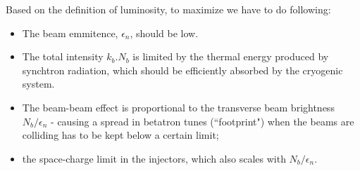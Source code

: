 Based on the definition of luminosity, to maximize we have to do following:
\begin{itemize}
    \item The beam emmitence, $\epsilon_n$, should be low.
    \item The total intensity $k_b.N_b$ is limited by the thermal energy produced by synchtron radiation, which should be efficiently absorbed by the cryogenic system.
    \item The beam-beam effect is proportional to the transverse beam brightness $N_b/\epsilon_n$ - causing a spread in betatron tunes (``footprint") when the beams are colliding has to be kept below a certain limit;
    \item the space-charge limit in the injectors, which also scales with $N_b/\epsilon_n$.
\end{itemize}